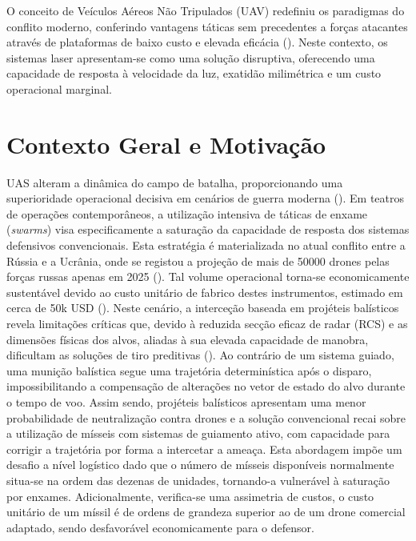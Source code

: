 \begin{introduction}
\label{chap:introduction}
O conceito de Veículos Aéreos Não Tripulados (UAV) redefiniu os paradigmas do conflito moderno, conferindo vantagens táticas sem precedentes a forças atacantes através de plataformas de baixo custo e elevada eficácia (\cite{rogers2023second}). Neste contexto, os sistemas laser apresentam-se como uma solução disruptiva, oferecendo uma capacidade de resposta à velocidade da luz, exatidão milimétrica e um custo operacional marginal.

\section{Contexto Geral e Motivação}
UAS alteram a dinâmica do campo de batalha, proporcionando uma superioridade operacional decisiva em cenários de guerra moderna (\cite{molloy2024drones}). Em teatros de operações contemporâneos, a utilização intensiva de táticas de enxame (\emph{swarms}) visa especificamente a saturação da capacidade de resposta dos sistemas defensivos convencionais. Esta estratégia é materializada no atual conflito entre a Rússia e a Ucrânia, onde se registou a projeção de mais de 50000 drones pelas forças russas apenas em 2025 (\cite{Jensen2025}). Tal volume operacional torna-se economicamente sustentável devido ao custo unitário de fabrico destes instrumentos, estimado em cerca de 50k USD (\cite{Anokhin2025}). Neste cenário, a interceção baseada em projéteis balísticos revela limitações críticas que, devido à reduzida secção eficaz de radar (RCS) e as dimensões físicas dos alvos, aliadas à sua elevada capacidade de manobra, dificultam as soluções de tiro preditivas (\cite{sedivy2021drone}). Ao contrário de um sistema guiado, uma munição balística segue uma trajetória determinística após o disparo, impossibilitando a compensação de alterações no vetor de estado do alvo durante o tempo de voo. Assim sendo, projéteis balísticos apresentam uma menor probabilidade de neutralização contra drones e a solução convencional recai sobre a utilização de mísseis com sistemas de guiamento ativo, com capacidade para corrigir a trajetória por forma a intercetar a ameaça. Esta abordagem impõe um desafio a nível logístico dado que o número de mísseis disponíveis normalmente situa-se na ordem das dezenas de unidades, tornando-a vulnerável à saturação por enxames. Adicionalmente, verifica-se uma assimetria de custos, o custo unitário de um míssil é de ordens de grandeza superior ao de um drone comercial adaptado, sendo desfavorável economicamente para o defensor. 


\end{introduction}
